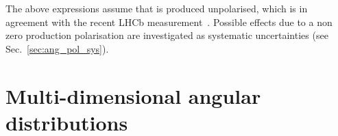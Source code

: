 %
%


The above expressions assume that \Lb is produced unpolarised, which is in agreement with the recent LHCb
measurement~\cite{LHCb-PAPER-2012-057}. Possible effects due to a non zero production polarisation
are investigated as systematic uncertainties (see Sec.~\ref{sec:ang_pol_sys}).


\section{Multi-dimensional angular distributions}
\label{sec:multidim_ang_distrib}

